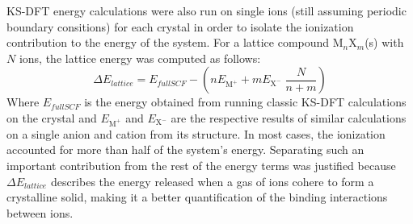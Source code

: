 \documentclass[aps,prb,twocolumn,amsmath,amssymb,superscriptaddress,longbibliography]{revtex4-1}
\begin{document}
KS-DFT energy calculations were also run on single ions (still assuming periodic boundary consitions) for each crystal in order to isolate the ionization contribution to the energy of the system. 
For a lattice compound $\text{M}_{n}\text{X}_{m}$(s) with $N$ ions, the lattice energy was computed as follows: 
\begin{equation*}
\Delta E_{lattice} = E_{full SCF} - (n E_{\text{M}^{+}} + m E_{\text{X}^{-}}\;\frac{N}{n+m})
\end{equation*} 
Where $E_{full SCF}$ is the energy obtained from running classic KS-DFT calculations on the crystal and $E_{\text{M}^{+}}$ and $E_{\text{X}^{-}}$ are the respective results of similar calculations on a single anion and cation from its structure. 
In most cases, the ionization accounted for more than half of the system's energy. 
Separating such an important contribution from the rest of the energy terms was justified because $\Delta E_{lattice}$ describes the energy released when a gas of ions cohere to form a crystalline solid, making it a better quantification of the binding interactions between ions.



 


\end{document}
